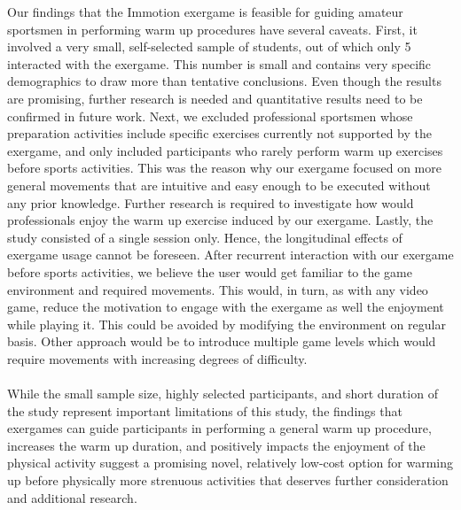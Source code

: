 Our findings that the Immotion exergame is feasible for guiding amateur sportsmen in performing warm up procedures have several caveats. First, it involved a very small, self-selected sample of students, out of which only 5  interacted with the exergame. This number is small and contains very specific demographics to draw more than tentative conclusions. Even though the results are promising, further research is needed and quantitative results need to be confirmed in future work. Next, we excluded professional sportsmen whose preparation activities include specific exercises currently not supported by the exergame, and only included participants who rarely perform warm up exercises before sports activities. This was the reason why our exergame focused on more general movements that are intuitive and easy enough to be executed without any prior knowledge.  Further research is required to investigate how would professionals enjoy the warm up exercise induced by our exergame. Lastly, the study consisted of a single session only. Hence, the longitudinal effects of exergame usage cannot be foreseen. After recurrent interaction with our exergame before sports activities, we believe the user would get familiar to the game environment  and required movements. This would, in turn, as with any video game, reduce the motivation to  engage with the exergame as well the enjoyment while playing it. This could be avoided by modifying the environment on regular basis. Other approach would be to introduce multiple  game levels which would require movements with increasing degrees of difficulty.\\\\
While the small sample size, highly selected participants, and short duration of the study represent important limitations of this study, the findings that exergames can guide participants in performing a general warm up procedure, increases the warm up duration, and positively impacts the enjoyment of the physical activity suggest a promising novel, relatively low-cost option for warming up before physically more strenuous activities that deserves further consideration and additional research.
